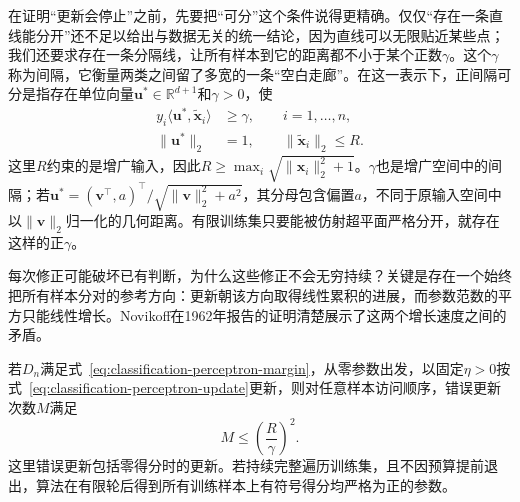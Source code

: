 在证明“更新会停止”之前，先要把“可分”这个条件说得更精确。仅仅“存在一条直线能分开”还不足以给出与数据无关的统一结论，因为直线可以无限贴近某些点；我们还要求存在一条分隔线，让所有样本到它的距离都不小于某个正数$\gamma$。这个$\gamma$称为间隔，它衡量两类之间留了多宽的一条“空白走廊”。在这一表示下，正间隔可分是指存在单位向量$\bm{u}^\ast\in\mathbb{R}^{d+1}$和$\gamma>0$，使
\begin{equation}
  \label{eq:classification-perceptron-margin}
  \begin{aligned}
    y_i\langle\bm{u}^\ast,\tilde{\bm{x}}_i\rangle
      &\geq\gamma,\qquad i=1,\ldots,n,\\
    \|\bm{u}^\ast\|_2&=1,\qquad
    \|\tilde{\bm{x}}_i\|_2\leq R .
  \end{aligned}
\end{equation}
这里$R$约束的是增广输入，因此$R\geq\max_i\sqrt{\|\bm{x}_i\|_2^2+1}$。$\gamma$也是增广空间中的间隔；若$\bm{u}^\ast=(\bm{v}^{\top},a)^{\top}/\sqrt{\|\bm{v}\|_2^2+a^2}$，其分母包含偏置$a$，不同于原输入空间中以$\|\bm{v}\|_2$归一化的几何距离。有限训练集只要能被仿射超平面严格分开，就存在这样的正$\gamma$。

每次修正可能破坏已有判断，为什么这些修正不会无穷持续？关键是存在一个始终把所有样本分对的参考方向：更新朝该方向取得线性累积的进展，而参数范数的平方只能线性增长。Novikoff在1962年报告的证明清楚展示了这两个增长速度之间的矛盾。

\begin{theorem}[感知机在有界可分样本下的最大更新次数]
  \label{thm:classification-perceptron-mistakes}
  若$D_n$满足式~\eqref{eq:classification-perceptron-margin}，从零参数出发，以固定$\eta>0$按式~\eqref{eq:classification-perceptron-update}更新，则对任意样本访问顺序，错误更新次数$M$满足
  \[
    M\leq\left(\frac R\gamma\right)^2 .
  \]
  这里错误更新包括零得分时的更新。若持续完整遍历训练集，且不因预算提前退出，算法在有限轮后得到所有训练样本上有符号得分均严格为正的参数。
\end{theorem}

